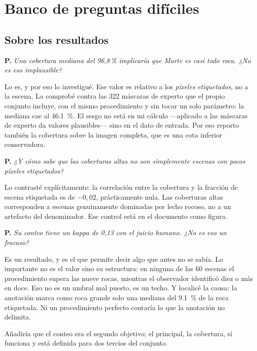 \documentclass[11pt]{article}
\newcommand{\pregunta}[1]{\medskip\noindent\textbf{\color{rojo}P.}\; \textit{#1}\par}
\begin{document}
\section{Banco de preguntas difíciles}

\subsection*{Sobre los resultados}

\pregunta{Una cobertura mediana del 96,8\,\% implicaría que Marte es casi todo roca. ¿No
es eso implausible?}
\begin{resp}
Lo es, y por eso lo investigué. Ese valor es relativo a los \emph{píxeles etiquetados}, no
a la escena. La comprobé contra las \num{322} máscaras de experto que el propio conjunto
incluye, con el mismo procedimiento y sin tocar un solo parámetro: la mediana cae al
\SI{46.1}{\percent}. El sesgo no está en mi cálculo —aplicado a las máscaras de experto da
valores plausibles— sino en el dato de entrada. Por eso reporto también la cobertura sobre
la imagen completa, que es una cota inferior conservadora.
\end{resp}

\pregunta{¿Y cómo sabe que las coberturas altas no son simplemente escenas con pocos
píxeles etiquetados?}
\begin{resp}
Lo contrasté explícitamente: la correlación entre la cobertura y la fracción de escena
etiquetada es de $-0{,}02$, prácticamente nula. Las coberturas altas corresponden a escenas
genuinamente dominadas por lecho rocoso, no a un artefacto del denominador. Ese control
está en el documento como figura.
\end{resp}

\pregunta{Su conteo tiene un kappa de 0,13 con el juicio humano. ¿No es eso un fracaso?}
\begin{resp}
Es un resultado, y es el que permite decir algo que antes no se sabía. Lo importante no es
el valor sino su estructura: en ninguna de las \num{60} escenas el procedimiento supera las
nueve rocas, mientras el observador identificó diez o más en doce. Eso no es un umbral mal
puesto, es un techo. Y localicé la causa: la anotación marca como roca grande solo una
mediana del \SI{9.1}{\percent} de la roca etiquetada. Ni un procedimiento perfecto contaría
lo que la anotación no delimita.

Añadiría que el conteo era el segundo objetivo; el principal, la cobertura, sí funciona y
está definida para dos tercios del conjunto.
\end{resp}
\end{document}
